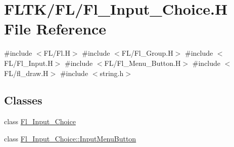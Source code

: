 \hypertarget{_fl___input___choice_8_h}{}\section{F\+L\+T\+K/\+F\+L/\+Fl\+\_\+\+Input\+\_\+\+Choice.H File Reference}
\label{_fl___input___choice_8_h}
{\ttfamily \#include $<$F\+L/\+Fl.\+H$>$}\newline
{\ttfamily \#include $<$F\+L/\+Fl\+\_\+\+Group.\+H$>$}\newline
{\ttfamily \#include $<$F\+L/\+Fl\+\_\+\+Input.\+H$>$}\newline
{\ttfamily \#include $<$F\+L/\+Fl\+\_\+\+Menu\+\_\+\+Button.\+H$>$}\newline
{\ttfamily \#include $<$F\+L/fl\+\_\+draw.\+H$>$}\newline
{\ttfamily \#include $<$string.\+h$>$}\newline
\subsection*{Classes}
\begin{DoxyCompactItemize}
\item 
class \hyperlink{class_fl___input___choice}{Fl\+\_\+\+Input\+\_\+\+Choice}
\item 
class \hyperlink{class_fl___input___choice_1_1_input_menu_button}{Fl\+\_\+\+Input\+\_\+\+Choice\+::\+Input\+Menu\+Button}
\end{DoxyCompactItemize}
